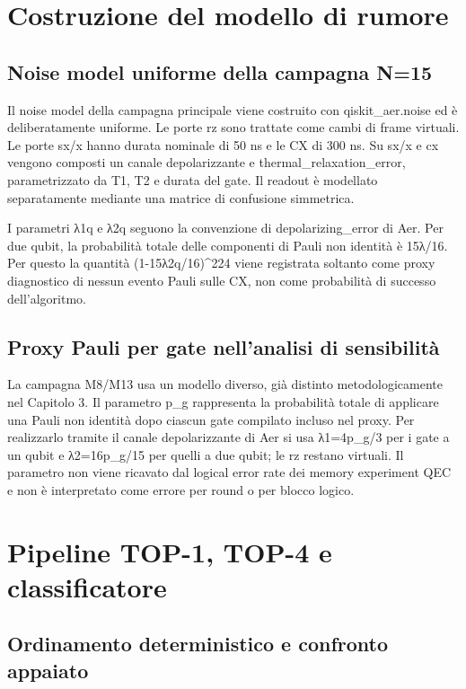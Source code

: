 \section{Costruzione del modello di rumore}\label{sec:finale_4_4}

\subsection{Noise model uniforme della campagna N=15}\label{sec:finale_4_4_1}

Il noise model della campagna principale viene costruito con qiskit\_aer.noise ed è deliberatamente uniforme. Le porte rz sono trattate come cambi di frame virtuali. Le porte sx/x hanno durata nominale di 50 ns e le CX di 300 ns. Su sx/x e cx vengono composti un canale depolarizzante e thermal\_relaxation\_error, parametrizzato da T1, T2 e durata del gate. Il readout è modellato separatamente mediante una matrice di confusione simmetrica.


I parametri λ1q e λ2q seguono la convenzione di depolarizing\_error di Aer. Per due qubit, la probabilità totale delle componenti di Pauli non identità è 15λ/16. Per questo la quantità (1-15λ2q/16)\^{}224 viene registrata soltanto come proxy diagnostico di nessun evento Pauli sulle CX, non come probabilità di successo dell'algoritmo.

\subsection{Proxy Pauli per gate nell'analisi di sensibilità}\label{sec:finale_4_4_2}

La campagna M8/M13 usa un modello diverso, già distinto metodologicamente nel Capitolo 3. Il parametro p\_g rappresenta la probabilità totale di applicare una Pauli non identità dopo ciascun gate compilato incluso nel proxy. Per realizzarlo tramite il canale depolarizzante di Aer si usa λ1=4p\_g/3 per i gate a un qubit e λ2=16p\_g/15 per quelli a due qubit; le rz restano virtuali. Il parametro non viene ricavato dal logical error rate dei memory experiment QEC e non è interpretato come errore per round o per blocco logico.

\section{Pipeline TOP-1, TOP-4 e classificatore}\label{sec:finale_4_5}

\subsection{Ordinamento deterministico e confronto appaiato}\label{sec:finale_4_5_1}

